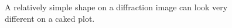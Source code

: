 \begin{figure}[htb]
    \caption{A relatively simple shape on a diffraction image 
    can look very different on a caked plot.}
    \label{box_mask}
\end{figure}




